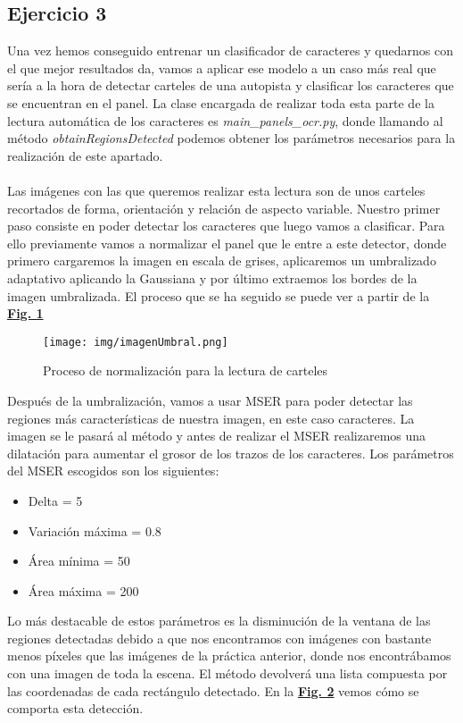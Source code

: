 \documentclass[a4paper, 12pt]{article}
\begin{document}
\subsection{Ejercicio 3}
Una vez hemos conseguido entrenar un clasificador de caracteres y quedarnos con el que mejor resultados da, vamos a aplicar ese modelo a un caso más real que sería a la hora de detectar carteles de una autopista y clasificar los caracteres que se encuentran en el panel. La clase encargada de realizar toda esta parte de la lectura automática de los caracteres es \textit{main\_panels\_ocr.py}, donde llamando al método \textit{obtainRegionsDetected} podemos obtener los parámetros necesarios para la realización de este apartado. \\\\
Las imágenes con las que queremos realizar esta lectura son de unos carteles recortados de forma, orientación y relación de aspecto variable. Nuestro primer paso consiste en poder detectar los caracteres que luego vamos a clasificar. Para ello previamente vamos a normalizar el panel que le entre a este detector, donde primero cargaremos la imagen en escala de grises, aplicaremos un umbralizado adaptativo aplicando la Gaussiana y por último extraemos los bordes de la imagen umbralizada. El proceso que se ha seguido se puede ver a partir de la \textbf{\hyperref[fig:normalizacion]{Fig. 1}}
\newpage
\begin{figure}[h]
	\centering
	\texttt{[image: img/imagenUmbral.png]}
 	\caption{Proceso de normalización para la lectura de carteles}\vspace{0.5cm}
	\label{fig:normalizacion}
\end{figure}
Después de la umbralización, vamos a usar MSER para poder detectar las regiones más características de nuestra imagen, en este caso caracteres. La imagen se le pasará al método y antes de realizar el MSER realizaremos una dilatación para aumentar el grosor de los trazos de los caracteres. Los parámetros del MSER escogidos son los siguientes:
\begin{itemize}
    \item Delta = 5
    \item Variación máxima = 0.8
    \item Área mínima = 50
    \item Área máxima = 200
\end{itemize}
Lo más destacable de estos parámetros es la disminución de la ventana de las regiones detectadas debido a que nos encontramos con imágenes con bastante menos píxeles que las imágenes de la práctica anterior, donde nos encontrábamos con una imagen de toda la escena. El método devolverá una lista compuesta por las coordenadas de cada rectángulo detectado. En la \textbf{\hyperref[fig:normalizacion]{Fig. 2}} vemos cómo se comporta esta detección. 
\end{document}

